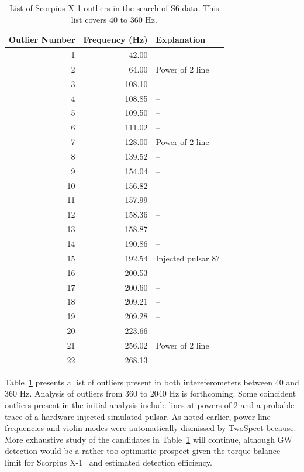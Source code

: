 \begin{table}
\begin{center}
\begin{tabular}{r r l}
Outlier Number & Frequency (Hz) & Explanation \\
\hline
1 & 42.00 & -- \\
2 & 64.00 & Power of 2 line \\
3 & 108.10 & -- \\
4 & 108.85 & -- \\
5 & 109.50 & -- \\
6 & 111.02 & -- \\
7 & 128.00 & Power of 2 line \\
8 & 139.52 & -- \\
9 & 154.04 & -- \\
10 & 156.82 & -- \\
11 & 157.99 & -- \\
12 & 158.36 & -- \\
13 & 158.87 & -- \\
14 & 190.86 & -- \\
15 & 192.54 & Injected pulsar 8? \\
16 & 200.53 & -- \\
17 & 200.60 & -- \\
18 & 209.21 & -- \\
19 & 209.28 & -- \\
20 & 223.66 & -- \\
21 & 256.02 & Power of 2 line \\
22 & 268.13 & -- \\
\end{tabular}
\caption{List of Scorpius X-1 outliers in the search of S6 data. This list covers 40 to 360 Hz.}
\label{ScoX1S6outlierTable}
\end{center}
\end{table}

Table~\ref{ScoX1S6outlierTable} presents a list of outliers present in both intereferometers between 40 and 360 Hz.
Analysis of outliers from 360 to 2040 Hz is forthcoming.
Some coincident outliers present in the initial analysis include lines at powers of 2 and a probable trace of a hardware-injected simulated pulsar.
As noted earlier, power line frequencies and violin modes were automatically dismissed by TwoSpect because.
More exhaustive study of the candidates in Table~\ref{ScoX1S6outlierTable} will continue, although GW detection would be a rather too-optimistic prospect given the torque-balance limit for Scorpius X-1~\cite{Bildsten1998} and estimated detection efficiency.

